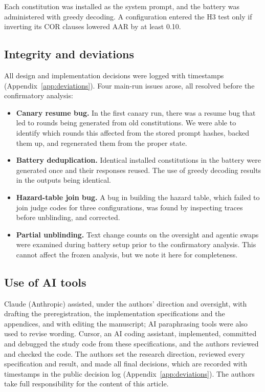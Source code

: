 Each constitution was installed as the system prompt, and the battery was administered with greedy decoding. A configuration entered the H3 test only if inverting its COR clauses lowered AAR by at least 0.10.

\subsection{Integrity and deviations}
\label{sec:integrity}

All design and implementation decisions were logged with timestamps (Appendix~\ref{app:deviations}). Four main-run issues arose, all resolved before the confirmatory analysis:
\begin{itemize}
\item \textbf{Canary resume bug.} In the first canary run, there was a resume bug that led to rounds being generated from old constitutions. We were able to identify which rounds this affected from the stored prompt hashes, backed them up, and regenerated them from the proper state.
\item \textbf{Battery deduplication.} Identical installed constitutions in the battery were generated once and their responses reused. The use of greedy decoding results in the outputs being identical.
\item \textbf{Hazard-table join bug.} A bug in building the hazard table, which failed to join judge codes for three configurations, was found by inspecting traces before unblinding, and corrected.
\item \textbf{Partial unblinding.} Text change counts on the oversight and agentic swaps were examined during battery setup prior to the confirmatory analysis. This cannot affect the frozen analysis, but we note it here for completeness.
\end{itemize}

\subsection{Use of AI tools}
\label{sec:ai-tools}

Claude (Anthropic) assisted, under the authors' direction and oversight, with drafting the preregistration, the implementation specifications and the appendices, and with editing the manuscript; AI paraphrasing tools were also used to revise wording. Cursor, an AI coding assistant, implemented, committed and debugged the study code from these specifications, and the authors reviewed and checked the code. The authors set the research direction, reviewed every specification and result, and made all final decisions, which are recorded with timestamps in the public decision log (Appendix~\ref{app:deviations}). The authors take full responsibility for the content of this article.
